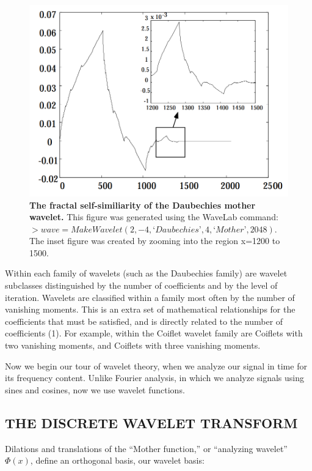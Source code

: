 \documentclass{article}
\begin{document}
\begin{figure}[h!]
\centering
\includegraphics[scale=0.45]{daubechies.png}
\caption{\textbf{The fractal self-similiarity of the Daubechies mother wavelet.} This figure was generated using the WaveLab command: \(>wave=MakeWavelet(2,-4,‘Daubechies’,4,‘Mother’,2048)\). The inset figure was created by zooming into the region x=1200 to 1500.}
\label{fig:daubechies}
\end{figure}

Within each family of wavelets (such as the Daubechies family) are wavelet subclasses distinguished by the number of coefficients and by the level of iteration. 
Wavelets are classified within a family most often by the number of vanishing moments. 
This is an extra set of mathematical relationships for the coefficients that must be satisfied, and is directly related to the number of coefficients (1). 
For example, within the Coiflet wavelet family are Coiflets with two vanishing moments, and Coiflets with three vanishing moments.

Now we begin our tour of wavelet theory, when we analyze our signal in time for its frequency
content. Unlike Fourier analysis, in which we analyze signals using sines and cosines, now we use
wavelet functions.

\subsection{THE DISCRETE WAVELET TRANSFORM}

Dilations and translations of the “Mother function,” or “analyzing wavelet” \(\Phi(x)\), define an orthogonal basis, our wavelet basis:
\end{document}
